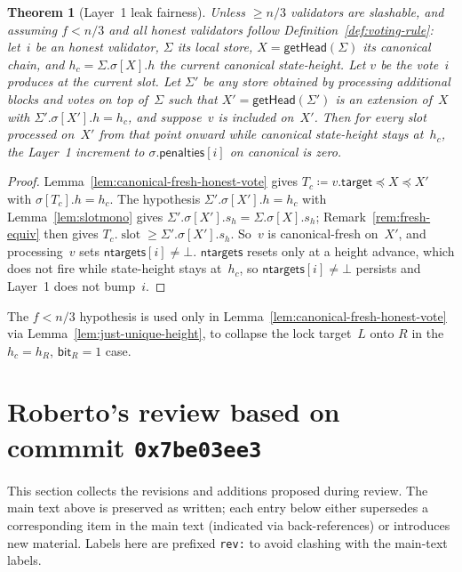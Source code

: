 \documentclass{article}
\newcommand{\slot}[0]{\ensuremath{\operatorname{\mathrm{slot}}}}
\newcommand{\target}{\mathsf{target}}
\newcommand{\ntargets}{\mathsf{ntargets}}
\newcommand{\penalties}{\mathsf{penalties}}
\newcommand{\bit}{\mathsf{bit}}
\newcommand{\getHead}{\textsf{getHead}\xspace}
\theoremstyle{plain}
\newtheorem{theorem}{Theorem}
\theoremstyle{definition}
\theoremstyle{remark}
\begin{document}
\begin{theorem}[Layer~1 leak fairness]\label{thm:fairness}
Unless $\geq n/3$ validators are slashable, and assuming $f < n/3$ and all honest validators follow Definition~\ref{def:voting-rule}: let~$i$ be an honest validator, $\Sigma$ its local store, $X = \getHead(\Sigma)$ its canonical chain, and $h_c = \Sigma.\sigma[X].h$ the current canonical state-height.
Let $v$ be the vote~$i$ produces at the current slot.
Let $\Sigma'$ be any store obtained by processing additional blocks and votes on top of~$\Sigma$ such that $X' = \getHead(\Sigma')$ is an extension of~$X$ with $\Sigma'.\sigma[X'].h = h_c$, and suppose~$v$ is included on~$X'$.
Then for every slot processed on~$X'$ from that point onward while canonical state-height stays at~$h_c$, the Layer~1 increment to $\sigma.\penalties[i]$ on canonical is zero.
\end{theorem}

\begin{proof}
Lemma~\ref{lem:canonical-fresh-honest-vote} gives $T_c \coloneqq v.\target \preceq X \preceq X'$ with $\sigma[T_c].h = h_c$.
The hypothesis $\Sigma'.\sigma[X'].h = h_c$ with Lemma~\ref{lem:slotmono} gives $\Sigma'.\sigma[X'].s_h = \Sigma.\sigma[X].s_h$; Remark~\ref{rem:fresh-equiv} then gives $T_c.\slot \geq \Sigma'.\sigma[X'].s_h$.
So~$v$ is canonical-fresh on~$X'$, and processing~$v$ sets $\ntargets[i] \neq \bot$.
$\ntargets$ resets only at a height advance, which does not fire while state-height stays at~$h_c$, so $\ntargets[i] \neq \bot$ persists and Layer~1 does not bump~$i$.
\end{proof}

The $f < n/3$ hypothesis is used only in Lemma~\ref{lem:canonical-fresh-honest-vote} via Lemma~\ref{lem:just-unique-height}, to collapse the lock target~$L$ onto $R$ in the $h_c = h_R$, $\bit_R = 1$ case.

\section{Roberto's review based on commmit \texttt{0x7be03ee3}}\label{sec:roberto-review}

This section collects the revisions and additions proposed during review.
The main text above is preserved as written; each entry below either supersedes a corresponding item in the main text (indicated via back-references) or introduces new material.
Labels here are prefixed \texttt{rev:} to avoid clashing with the main-text labels.
\end{document}
